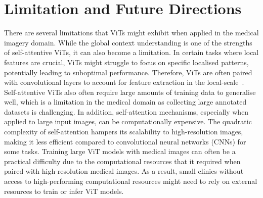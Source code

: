 \documentclass[dvipsnames]{article}
\renewcommand{\cite}[1]{\autocite{#1}}
\begin{document}
\section{Limitation and Future Directions}

There are several limitations that ViTs might exhibit when applied in the medical imagery domain.
While the global context understanding is one of the strengths of self-attentive ViTs, it can also become a limitation.
In certain tasks where local features are crucial, ViTs might struggle to focus on specific localised patterns, potentially leading to suboptimal performance.
Therefore, ViTs are often paired with convolutional layers to account for feature extraction in the local-scale~\cite{xie2021cotr}.
Self-attentive ViTs also often require large amounts of training data to generalise well, which is a limitation in the medical domain as collecting large annotated datasets is challenging.
In addition, self-attention mechanisms, especially when applied to large input images, can be computationally expensive. The quadratic complexity of self-attention hampers its scalability to high-resolution images, making it less efficient compared to convolutional neural networks (CNNs) for some tasks.
Training large ViT models with medical images can often be a practical difficulty due to the computational resources that it required when paired with high-resolution medical images.
As a result, small clinics without access to high-performing computational resources might need to rely on external resources to train or infer ViT models.
\end{document}
